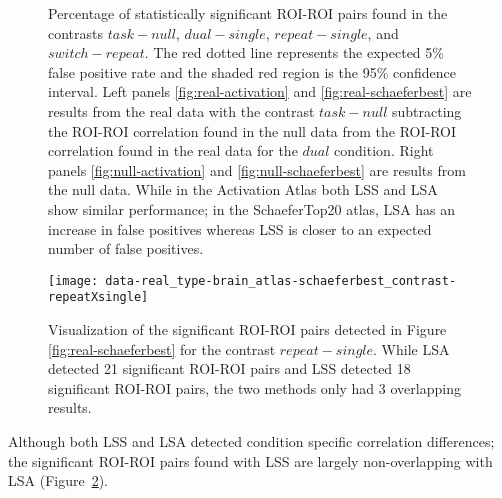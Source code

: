 \documentclass[phd,appendix,figures]{uithesis}
\begin{document}
\begin{figure}[H]
  \centering
  \hfill
  \vfill
  \hfill
  \caption[Comparison of LSS/LSA in participant data]{
    Percentage of statistically significant ROI-ROI pairs found
    in the contrasts $task - null$, $dual - single$, $repeat - single$, and
    $switch - repeat$.
    The red dotted line represents the expected 5\% false positive rate
    and the shaded red region is the 95\% confidence interval.
    Left panels \ref{fig:real-activation} and \ref{fig:real-schaeferbest}
    are results from the real data with the contrast $task - null$ subtracting the
    ROI-ROI correlation found in the null data from the ROI-ROI correlation found in the
    real data for the $dual$ condition.
    Right panels \ref{fig:null-activation} and \ref{fig:null-schaeferbest} are results
    from the null data.
    While in the Activation Atlas both LSS and LSA show similar performance;
    in the SchaeferTop20 atlas, LSA has an increase in false positives
    whereas LSS is closer to an expected number of false positives.
  }
\label{fig:main-result}
\end{figure}

\begin{figure}[H]
  \centering
  \texttt{[image: 
    data-real\_type-brain\_atlas-schaeferbest\_contrast-repeatXsingle]}
  \caption[SchaeferTop20 atlas, real data, repeat - single]{
    Visualization of the significant ROI-ROI pairs detected in Figure \ref{fig:real-schaeferbest}
    for the contrast $repeat - single$.
    While LSA detected 21 significant ROI-ROI pairs and LSS detected 18 significant
    ROI-ROI pairs, the two methods only had 3 overlapping results.
  }
\label{fig:non-overlap}
\end{figure}

Although both LSS and LSA detected condition specific correlation differences;
the significant ROI-ROI pairs found with LSS are largely non-overlapping with LSA (Figure~\ref{fig:non-overlap}).
\end{document}
